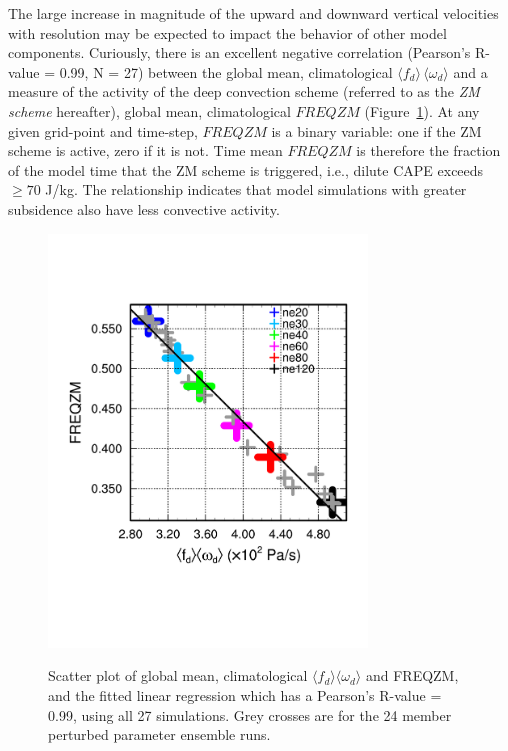 \documentclass[times]{qjrms4}
\begin{document}
The large increase in magnitude of the upward and downward vertical velocities with resolution may be expected to impact the behavior of other model components. Curiously, there is an excellent negative correlation (Pearson's R-value = 0.99, N = 27) between the global mean, climatological $\langle f_{d} \rangle \, \langle \omega_{d} \rangle$ and a measure of the activity of the \cite{ZM1995AO} deep convection scheme (referred to as the {\em{ZM scheme}} hereafter), global mean, climatological $FREQZM$ (Figure~\ref{fig:corr}). At any given grid-point and time-step, $FREQZM$ is a binary variable: one if the ZM scheme is active, zero if it is not. Time mean $FREQZM$ is therefore the fraction of the model time that the ZM scheme is triggered, i.e., dilute CAPE exceeds $\geq 70$ J/kg. The relationship indicates that model simulations with greater subsidence also have less convective activity.

\begin{figure}
\begin{center}
\noindent\includegraphics[width=20pc,angle=0]{figs/temp_diags_corr.pdf}\\
\end{center}
\caption{Scatter plot of global mean, climatological $\langle f_{d} \rangle \langle \omega_{d} \rangle$ and FREQZM, and the fitted linear regression which has a Pearson's R-value = 0.99, using all 27 simulations. Grey crosses are for the 24 member perturbed parameter ensemble runs.}
\label{fig:corr}
\end{figure}
\end{document}
